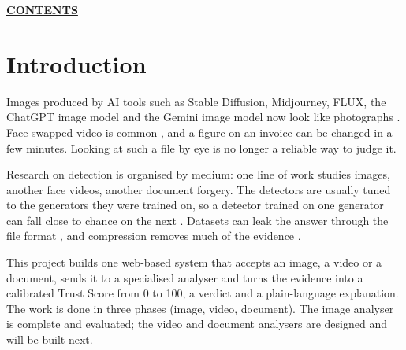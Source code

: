 \documentclass[12pt,a4paper]{article}
\begin{document}

\thispagestyle{empty}
\begin{center}{\bfseries\Large\underline{CONTENTS}}\end{center}
\vspace{6pt}
\renewcommand{\contentsname}{}
{\small\tableofcontents}
\newpage
\setcounter{page}{1}
\onehalfspacing

\section{Introduction}
Images produced by AI tools such as Stable Diffusion, Midjourney, FLUX, the ChatGPT image model and the Gemini image model now look like photographs \cite{rombach}. Face-swapped video is common \cite{rossler}, and a figure on an invoice can be changed in a few minutes. Looking at such a file by eye is no longer a reliable way to judge it.

Research on detection is organised by medium: one line of work studies images, another face videos, another document forgery. The detectors are usually tuned to the generators they were trained on, so a detector trained on one generator can fall close to chance on the next \cite{ojha,wang}. Datasets can leak the answer through the file format \cite{grommelt}, and compression removes much of the evidence \cite{corvi}.

This project builds one web-based system that accepts an image, a video or a document, sends it to a specialised analyser and turns the evidence into a calibrated Trust Score from 0 to 100, a verdict and a plain-language explanation. The work is done in three phases (image, video, document). The image analyser is complete and evaluated; the video and document analysers are designed and will be built next.

\end{document}
